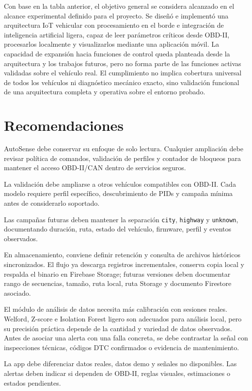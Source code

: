 \documentclass[12pt,letterpaper]{report}
\begin{document}
Con base en la tabla anterior, el objetivo general se considera alcanzado en el alcance experimental definido para el proyecto. Se diseñó e implementó una arquitectura IoT vehicular con procesamiento en el borde e integración de inteligencia artificial ligera, capaz de leer parámetros críticos desde OBD-II, procesarlos localmente y visualizarlos mediante una aplicación móvil. La capacidad de expansión hacia funciones de control queda planteada desde la arquitectura y los trabajos futuros, pero no forma parte de las funciones activas validadas sobre el vehículo real. El cumplimiento no implica cobertura universal de todos los vehículos ni diagnóstico mecánico exacto, sino validación funcional de una arquitectura completa y operativa sobre el entorno probado.

\section{Recomendaciones}

AutoSense debe conservar su enfoque de solo lectura. Cualquier ampliación debe revisar política de comandos, validación de perfiles y contador de bloqueos para mantener el acceso OBD-II/CAN dentro de servicios seguros.

La validación debe ampliarse a otros vehículos compatibles con OBD-II. Cada modelo requiere perfil específico, descubrimiento de PIDs y campaña mínima antes de considerarlo soportado.

Las campañas futuras deben mantener la separación \texttt{city}, \texttt{highway} y \texttt{unknown}, documentando duración, ruta, estado del vehículo, firmware, perfil y eventos observados.

En almacenamiento, conviene definir retención y consulta de archivos históricos sincronizados. El flujo ya descarga registros incrementales, conserva copia local y respalda el binario en Firebase Storage; futuras versiones deben documentar rango de secuencias, tamaño, ruta local, ruta Storage y documento Firestore asociado.

El módulo de análisis de datos necesita más calibración con sesiones reales. Welford, Z-score e Isolation Forest ligero son adecuados para análisis local, pero su precisión práctica depende de la cantidad y variedad de datos observados. Antes de asociar una alerta con una falla concreta, se debe contrastar la señal con inspecciones técnicas, códigos DTC confirmados o evidencia de mantenimiento.

La app debe diferenciar datos reales, datos demo y señales no disponibles. Las alertas deben indicar si dependen de OBD-II, reglas visuales, estimaciones o estados pendientes.
\end{document}
